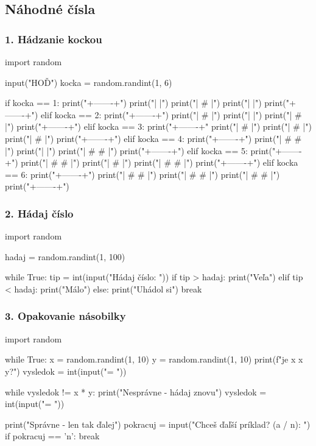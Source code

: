 \subsection{Náhodné čísla}
\subsubsection*{1. Hádzanie kockou}

\begin{solution}
import random

input("HOĎ")
kocka = random.randint(1, 6)

if kocka == 1:
	print("+-------+")
	print("|       |")
    print("|   #   |")
	print("|       |")
	print("+-------+")
elif kocka == 2:
	print("+-------+")
    print("| #     |")
    print("|       |")
    print("|     # |")
    print("+-------+")
elif kocka == 3:
	print("+-------+"
	print("| #     |")
	print("|   #   |")
	print("|     # |")
	print("+-------+")
elif kocka == 4:
	print("+-------+")
	print("| #   # |")
	print("|       |")
	print("| #   # |")
	print("+-------+")
elif kocka == 5:
	print("+-------+")
	print("| #   # |")
	print("|   #   |")
	print("| #   # |")
	print("+-------+")
elif kocka == 6:
	print("+-------+")
	print("| #   # |")
	print("| #   # |")
	print("| #   # |")
	print("+-------+")
\end{solution}

\subsubsection*{2. Hádaj číslo}
\begin{solution}
import random

hadaj = random.randint(1, 100)

while True:
	tip = int(input("Hádaj číslo: "))
	if tip > hadaj:
		print("Veľa")
	elif tip < hadaj:
        print("Málo")
    else:
        print("Uhádol si")
        break
\end{solution}


\subsubsection*{3. Opakovanie násobilky}
\begin{solution}
import random

while True:
    x = random.randint(1, 10)
    y = random.randint(1, 10)
    print(f" je {x} x {y}?")
    vysledok = int(input("= "))

    while vysledok != x * y:
        print("Nesprávne - hádaj znovu")
        vysledok = int(input("= "))

    print("Správne - len tak ďalej")
    pokracuj = input("Chceš ďaľší príklad? (a / n): ")
    if pokracuj == 'n':
        break
\end{solution}
